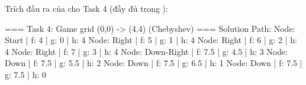 Trích đầu ra của  cho Task 4 (đầy đủ trong ):

\begin{khungbash}
=== Task 4: Game grid (0,0) -> (4,4) (Chebyshev) ===
Solution Path:
Node: Start | f: 4 | g: 0 | h: 4
Node: Right | f: 5 | g: 1 | h: 4
Node: Right | f: 6 | g: 2 | h: 4
Node: Right | f: 7 | g: 3 | h: 4
Node: Down-Right | f: 7.5 | g: 4.5 | h: 3
Node: Down | f: 7.5 | g: 5.5 | h: 2
Node: Down | f: 7.5 | g: 6.5 | h: 1
Node: Down | f: 7.5 | g: 7.5 | h: 0
\end{khungbash}
